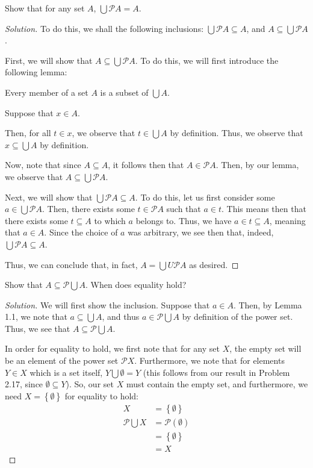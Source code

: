 \documentclass{article}
\newenvironment{solution}{\begin{proof}[Solution]}{\end{proof}}
\renewcommand\qedsymbol{$\blacksquare$}
\newenvironment{innerproof}{\renewcommand{\qedsymbol}{$\square$}\proof}{\endproof}
\newcommand{\pr}[1]{\left( {#1} \right)}
\newcommand{\brc}[1]{ \left\{  {#1} \right\}}
\begin{document}
	\begin{hw}[Problem 2.6a]
		Show that for any set $A$, $\bigcup\mathscr{P} A = A$.
	\end{hw}
	\begin{solution}
		To do this, we shall the following inclusions: $\bigcup \mathscr{P}A \subseteq A$, and $A \subseteq \bigcup \mathscr P A$.
		
		First, we will show that $A \subseteq \bigcup \mathscr{P} A$. To do this, we will first introduce the following lemma:
		
		\begin{lem}
			Every member of a set $A$ is a subset of $\bigcup A$.
		\end{lem}
		\begin{innerproof}
			Suppose that $x \in A$.
			
			Then, for all $t \in x$, we observe that $t \in \bigcup A$ by definition. Thus, we observe that $x \subseteq \bigcup A$ by definition.
		\end{innerproof}
		
	 	Now, note that since $A \subseteq A$, it follows then that $A \in \mathscr{P} A$. Then, by our lemma, we observe that $A \subseteq \bigcup \mathscr{P} A$.
		
		Next, we will show that $\bigcup \mathscr P A \subseteq A$. To do this, let us first consider some $a \in \bigcup \mathscr{P} A$. Then, there exists some $t \in \mathscr{P} A$ such that $a \in t$. This means then that there exists some $t \subseteq A$ to which $a$ belongs to. Thus, we have $a \in t \subseteq A$, meaning that $a \in A$. Since the choice of $a$ was arbitrary, we see then that, indeed, $\bigcup \mathscr{P} A \subseteq A$.
		
		Thus, we can conclude that, in fact, $A = \bigcup U \mathscr{P} A$ as desired.
	\end{solution}

	\begin{hw}[Problem 2.6b]
		Show that $A \subseteq \mathscr{P} \bigcup A$. When does equality hold?
	\end{hw}
	\begin{solution}
		We will first show the inclusion. Suppose that $a \in A$. Then, by Lemma 1.1, we note that $a \subseteq \bigcup A$, and thus $a \in \mathscr{P} \bigcup A$ by definition of the power set. Thus, we see that $A \subseteq \mathscr{P} \bigcup A$.
		
		In order for equality to hold, we first note that for any set $X$, the empty set will be an element of the power set $\mathscr{P} X$. Furthermore, we note that for elements $Y \in X$ which is a set itself, $Y \bigcup \emptyset = Y$ (this follows from our result in Problem 2.17, since $\emptyset \subseteq Y$). So, our set $X$ must contain the empty set, and furthermore, we need $X = \brc{\emptyset}$ for equality to hold:
		\begin{align*}
			X &= \brc{\emptyset} \\
			\mathscr{P}\bigcup X &= \mathscr{P}\pr{\emptyset} \\
			&= \brc{\emptyset} \\
			&= X
		\end{align*}
	\end{solution}
\end{document}
